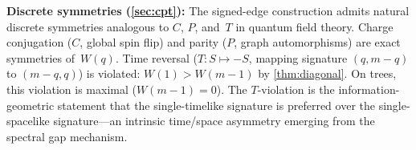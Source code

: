 \documentclass[11pt]{article}
\theoremstyle{definition}
\theoremstyle{remark}
\begin{document}
\textbf{Discrete symmetries (\cref{sec:cpt}):}
The signed-edge construction admits natural discrete symmetries analogous to
$C$, $P$, and~$T$ in quantum field theory. Charge conjugation ($C$, global
spin flip) and parity ($P$, graph automorphisms) are exact symmetries
of~$W(q)$. Time reversal ($T \colon S \mapsto -S$, mapping signature
$(q, m{-}q)$ to $(m{-}q, q)$) is violated: $W(1) > W(m{-}1)$ by
\cref{thm:diagonal}. On trees, this violation is maximal
($W(m{-}1) = 0$). The $T$-violation is the information-geometric
statement that the single-timelike signature is preferred over the
single-spacelike signature---an intrinsic time/space asymmetry
emerging from the spectral gap mechanism.




\end{document}
